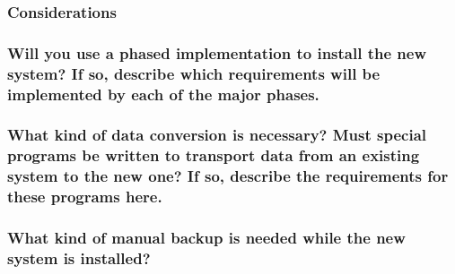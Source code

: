 \documentclass[
]{article}
\begin{document}
\hypertarget{considerations-52}{%
\subsubsection{Considerations}\label{considerations-52}}

\hypertarget{will-you-use-a-phased-implementation-to-install-the-new-system-if-so-describe-which-requirements-will-be-implemented-by-each-of-the-major-phases.}{%
\subsubsection{\texorpdfstring{Will you use a phased implementation to
install the new system? If so, describe which requirements will be
implemented by each of the major phases.
}{Will you use a phased implementation to install the new system? If so, describe which requirements will be implemented by each of the major phases. }}\label{will-you-use-a-phased-implementation-to-install-the-new-system-if-so-describe-which-requirements-will-be-implemented-by-each-of-the-major-phases.}}

\hypertarget{what-kind-of-data-conversion-is-necessary-must-special-programs-be-written-to-transport-data-from-an-existing-system-to-the-new-one-if-so-describe-the-requirements-for-these-programs-here.}{%
\subsubsection{\texorpdfstring{What kind of data conversion is
necessary? Must special programs be written to transport data from an
existing system to the new one? If so, describe the requirements for
these programs here.
}{What kind of data conversion is necessary? Must special programs be written to transport data from an existing system to the new one? If so, describe the requirements for these programs here. }}\label{what-kind-of-data-conversion-is-necessary-must-special-programs-be-written-to-transport-data-from-an-existing-system-to-the-new-one-if-so-describe-the-requirements-for-these-programs-here.}}

\hypertarget{what-kind-of-manual-backup-is-needed-while-the-new-system-is-installed}{%
\subsubsection{What kind of manual backup is needed while the new system
is
installed?}\label{what-kind-of-manual-backup-is-needed-while-the-new-system-is-installed}}
\end{document}
